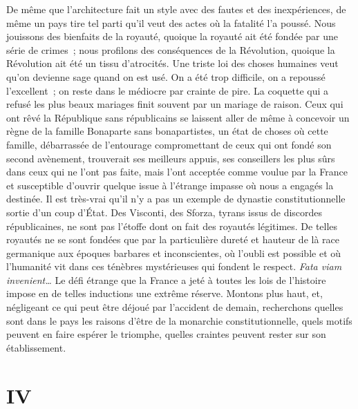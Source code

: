 \documentclass[french,twoside]{book} %
\begin{document}
De même que l’architecture fait un style avec des fautes et des inexpériences, de même un pays tire tel parti qu’il veut des actes où la fatalité l’a poussé. Nous jouissons des bienfaits de la royauté, quoique la royauté ait été fondée par une série de crimes ; nous profilons des conséquences de la Révolution, quoique la Révolution ait été un tissu d’atrocités. Une triste loi des choses humaines veut qu’on devienne sage quand on est usé. On a été trop difficile, on a repoussé l’excellent ; on reste dans le médiocre par crainte de pire. La coquette qui a refusé les plus beaux mariages finit souvent par un mariage de raison. Ceux qui ont rêvé la République sans républicains se laissent aller de même à concevoir un règne de la famille Bonaparte sans bonapartistes, un état de choses où cette famille, débarrassée de l’entourage compromettant de ceux qui ont fondé son second avènement, trouverait ses meilleurs appuis, ses conseillers les plus sûrs dans ceux qui ne l’ont pas faite, mais l’ont acceptée comme voulue par la France et susceptible d’ouvrir quelque issue à l’étrange impasse où nous a engagés la destinée. Il est très-vrai qu’il n’y a pas un exemple de dynastie constitutionnelle sortie d’un coup d’État. Des Visconti, des Sforza, tyrans issus de discordes républicaines, ne sont pas l’étoffe dont on fait des royautés légitimes. De telles royautés ne se sont fondées que par la particulière dureté et hauteur de là race germanique aux époques barbares et inconscientes, où l’oubli est possible et où l’humanité vit dans ces ténèbres mystérieuses qui fondent le respect. {\itshape Fata viam invenient…} Le défi étrange que la France a jeté à toutes les lois de l’histoire impose en de telles inductions une extrême réserve. Montons plus haut, et, négligeant ce qui peut être déjoué par l’accident de demain, recherchons quelles sont dans le pays les raisons d’être de la monarchie constitutionnelle, quels motifs peuvent en faire espérer le triomphe, quelles craintes peuvent rester sur son établissement.
\section[{IV}]{IV}\renewcommand{\leftmark}{IV}
\end{document}
